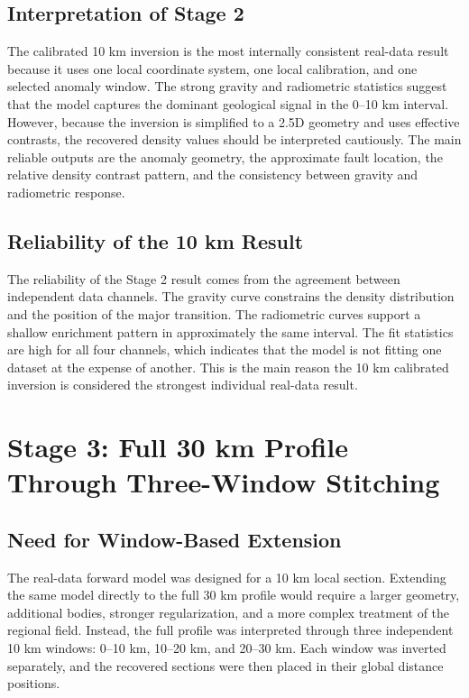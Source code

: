 \documentclass[12pt,a4paper]{article}
\begin{document}
\subsection{Interpretation of Stage 2}
The calibrated 10 km inversion is the most internally consistent real-data result because it uses one local coordinate system, one local calibration, and one selected anomaly window. The strong gravity and radiometric statistics suggest that the model captures the dominant geological signal in the 0--10 km interval. However, because the inversion is simplified to a 2.5D geometry and uses effective contrasts, the recovered density values should be interpreted cautiously. The main reliable outputs are the anomaly geometry, the approximate fault location, the relative density contrast pattern, and the consistency between gravity and radiometric response.

\subsection{Reliability of the 10 km Result}
The reliability of the Stage 2 result comes from the agreement between independent data channels. The gravity curve constrains the density distribution and the position of the major transition. The radiometric curves support a shallow enrichment pattern in approximately the same interval. The fit statistics are high for all four channels, which indicates that the model is not fitting one dataset at the expense of another. This is the main reason the 10 km calibrated inversion is considered the strongest individual real-data result.

\clearpage
\section{Stage 3: Full 30 km Profile Through Three-Window Stitching}
\subsection{Need for Window-Based Extension}
The real-data forward model was designed for a 10 km local section. Extending the same model directly to the full 30 km profile would require a larger geometry, additional bodies, stronger regularization, and a more complex treatment of the regional field. Instead, the full profile was interpreted through three independent 10 km windows: 0--10 km, 10--20 km, and 20--30 km. Each window was inverted separately, and the recovered sections were then placed in their global distance positions.
\end{document}
